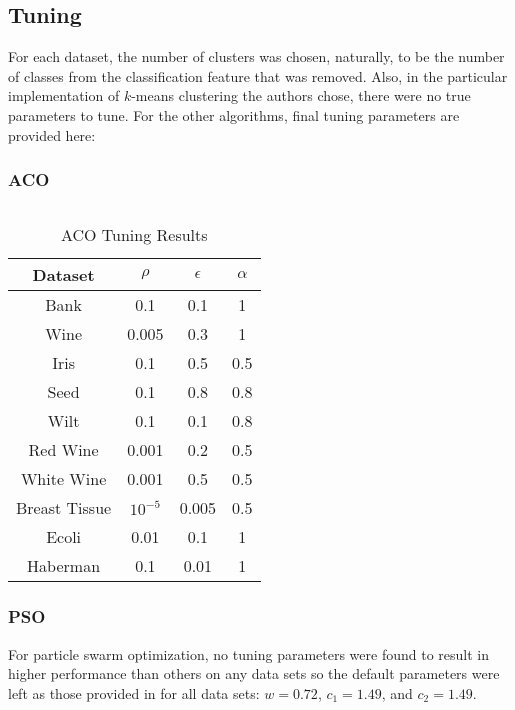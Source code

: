 \documentclass[conference]{IEEEtran}
\begin{document}
  \subsection{Tuning}
  For each dataset, the number of clusters was chosen, naturally, to be the number of classes from the classification feature that was removed. Also, in the particular implementation of $k$-means clustering the authors chose, there were no true parameters to tune. For the other algorithms, final tuning parameters are provided here:
  
  \subsubsection{ACO}
$\;$
  
  \begin{table}[h]
  \caption{ACO Tuning Results}
  \resizebox{1.3\textwidth}{!} {\begin{minipage}{\textwidth}

      \begin{tabular}{ c |c | c | c }
        Dataset & $\rho$ & $\epsilon$ & $\alpha$ \\ \hline
        Bank & 0.1 & 0.1 & 1 \\
        Wine & 0.005 & 0.3 & 1 \\
        Iris & 0.1 & 0.5 & 0.5 \\
        Seed & 0.1 & 0.8 & 0.8 \\
        Wilt & 0.1 & 0.1 & 0.8 \\
        Red Wine & 0.001 & 0.2 & 0.5 \\
        White Wine & 0.001 & 0.5 & 0.5 \\
        Breast Tissue & $10^{-5}$ & 0.005 & 0.5 \\
        Ecoli & 0.01 & 0.1 & 1 \\
        Haberman & 0.1 & 0.01 & 1
      \end{tabular}

      \label{table:acoTuning}
  \end{minipage} }
  \end{table}

  \subsubsection{PSO}
  For particle swarm optimization, no tuning parameters were found to result in higher performance than others on any data sets so the default parameters were left as those provided in \cite{merwe} for all data sets: $w=0.72$, $c_1=1.49$, and $c_2=1.49$.
\end{document}
